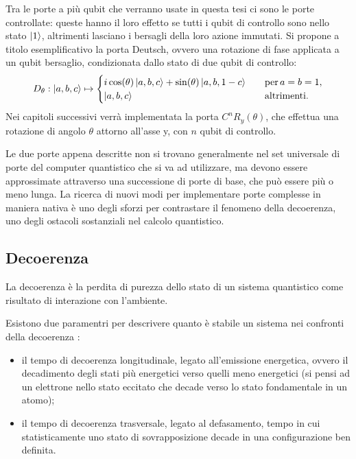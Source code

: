 Tra le porte a più qubit che verranno usate in questa tesi ci sono le porte controllate: 
queste hanno il loro effetto se tutti i qubit di controllo sono nello stato $\ket{1}$, 
altrimenti lasciano i bersagli della loro azione immutati. 
Si propone a titolo esemplificativo la porta Deutsch, ovvero una rotazione di fase applicata 
a un qubit bersaglio, condizionata dallo stato di due qubit di controllo: 
\begin{equation}
    D_{\theta} : \ket{a,b,c} \mapsto \begin{cases}
        i \cos(\theta)\ket{a,b,c} + \sin(\theta)\ket{a,b,1-c} \quad &\text{per}\, a=b=1, \\ 
        \ket{a,b,c} \quad &\text{altrimenti}.
    \end{cases}
\end{equation}
Nei capitoli successivi verrà implementata la porta $C^n R_y (\theta)$, che effettua una 
rotazione di angolo $\theta$ attorno all'asse y, con $n$ qubit di controllo. 


Le due porte appena descritte non si trovano generalmente nel set universale di porte 
del computer quantistico che si va ad utilizzare, ma devono 
essere approssimate attraverso una successione di porte di base, che può essere più o 
meno lunga. La ricerca di nuovi modi per implementare porte complesse in maniera 
nativa \cite{PhysRevApplied.9.051001} è uno degli sforzi per contrastare il fenomeno della 
decoerenza, uno degli ostacoli sostanziali nel calcolo quantistico. 

\subsection{Decoerenza} \label{sec:decoerenza}

\begin{definition}
    La decoerenza è la perdita di purezza dello stato di un sistema quantistico come risultato 
    di interazione con l'ambiente. 
\end{definition}

Esistono due paramentri per descrivere quanto è stabile un sistema nei confronti della decoerenza \cite{IBM_decoherence}: 
\begin{itemize}
    \item il tempo di decoerenza longitudinale, legato all'emissione energetica, 
    ovvero il decadimento degli stati più energetici verso quelli meno energetici
    (si pensi ad un elettrone nello stato eccitato che decade verso lo stato fondamentale in un atomo);
    \item il tempo di decoerenza trasversale, legato al defasamento, tempo in cui 
    statisticamente uno stato di sovrapposizione decade in una configurazione ben definita. 
\end{itemize}


